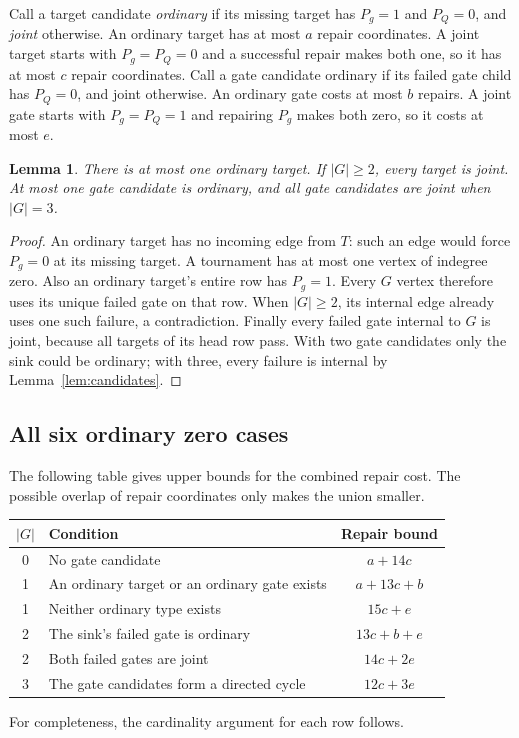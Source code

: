 \documentclass[11pt]{amsart}
\newtheorem{lemma}[theorem]{Lemma}
\theoremstyle{definition}
\theoremstyle{remark}
\begin{document}
Call a target candidate \emph{ordinary} if its missing target has
$P_g=1$ and $P_Q=0$, and \emph{joint} otherwise. An ordinary target
has at most $a$ repair coordinates. A joint target starts with
$P_g=P_Q=0$ and a successful repair makes both one, so it has at most
$c$ repair coordinates. Call a gate candidate ordinary if its failed
gate child has $P_Q=0$, and joint otherwise. An ordinary gate costs
at most $b$ repairs. A joint gate starts with $P_g=P_Q=1$ and repairing
$P_g$ makes both zero, so it costs at most $e$.

\begin{lemma}\label{lem:ordinary}
There is at most one ordinary target. If $|G|\ge2$, every target is
joint. At most one gate candidate is ordinary, and all gate candidates
are joint when $|G|=3$.
\end{lemma}
\begin{proof}
An ordinary target has no incoming edge from $T$: such an edge would
force $P_g=0$ at its missing target. A tournament has at most one
vertex of indegree zero. Also an ordinary target's entire row has
$P_g=1$. Every $G$ vertex therefore uses its unique failed gate on
that row. When $|G|\ge2$, its internal edge already uses one such
failure, a contradiction. Finally every failed gate internal to $G$
is joint, because all targets of its head row pass. With two gate
candidates only the sink could be ordinary; with three, every failure
is internal by Lemma~\ref{lem:candidates}.
\end{proof}

\subsection{All six ordinary zero cases}\label{sec:cases}
The following table gives upper bounds for the combined repair cost.
The possible overlap of repair coordinates only makes the union smaller.
\begin{center}
\small
\begin{tabular}{@{}c p{6.8cm} c@{}}
\toprule
$|G|$ & Condition & Repair bound\\
\midrule
0 & No gate candidate & $a+14c$\\
1 & An ordinary target or an ordinary gate exists & $a+13c+b$\\
1 & Neither ordinary type exists & $15c+e$\\
2 & The sink's failed gate is ordinary & $13c+b+e$\\
2 & Both failed gates are joint & $14c+2e$\\
3 & The gate candidates form a directed cycle & $12c+3e$\\
\bottomrule
\end{tabular}
\end{center}
For completeness, the cardinality argument for each row follows.
\end{document}
